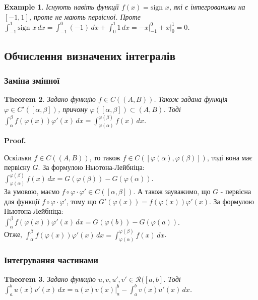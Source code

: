 \documentclass[a4paper, 10pt]{article}
\makeatletter
\def\huge{\displaystyle}
\def\qed{$\blacksquare$}
\theoremstyle{theoremdd}
\newtheorem{theorem}{Theorem}[subsection]
\theoremstyle{theoremdd}
\theoremstyle{theoremdd}
\theoremstyle{theoremdd}
\newtheorem{example}[theorem]{Example}
\theoremstyle{theoremdd}
\theoremstyle{theoremdd}
\theoremstyle{theoremdd}
\theoremstyle{theoremdd}
\renewenvironment{proof}[1][Proof.\\]{\par
\pushQED{\hfill \qed}%
\normalfont \topsep6\p@\@plus6\p@\relax
\trivlist
\item\relax
{\bfseries
#1\@addpunct{.}}\hspace\labelsep\ignorespaces
}{%
\popQED\endtrivlist\@endpefalse
}
\makeatother
\begin{document}
\begin{example}
Існують навіть функції $f(x) = \text{sign } x$, які є інтегрованими на $[-1,1]$, проте не мають первісної. Проте $\huge\int_{-1}^1 \text{sign } x \,dx = \int_{-1}^0 (-1)\,dx + \int_0^1 1 \,dx = -x \Big|_{-1}^0 + x \Big|_{0}^1 = 0$.
\end{example}

\subsection{Обчислення визначених інтегралів}
\subsubsection{Заміна змінної}
\begin{theorem}
Задано функцію $f \in C((A,B))$. Також задана функція $\varphi \in C'([\alpha,\beta])$, причому $\varphi([\alpha,\beta]) \subset (A,B)$. Тоді
$\huge\int_\alpha^\beta f(\varphi(x))\varphi'(x)\,dx = \int_{\varphi(\alpha)}^{\varphi(\beta)} f(x)\,dx$.
\end{theorem}

\begin{proof}
Оскільки $f \in C((A,B))$, то також $f \in C([\varphi(\alpha), \varphi(\beta)])$, тоді вона має первісну $G$. За формулою Ньютона-Лейбніца:\\
$\huge\int_{\varphi(\alpha)}^{\varphi(\beta)} f(x)\,dx = G(\varphi(\beta)) - G(\varphi(\alpha))$.\\
За умовою, маємо $f \circ \varphi \cdot \varphi' \in C([\alpha,\beta])$. А також зауважимо, що $G$ - первісна для функції $f \circ \varphi \cdot \varphi'$, тому що $G'(\varphi(x)) = f(\varphi(x)) \varphi'(x)$. За формулою Ньютона-Лейбніца:\\
$\huge\int_\alpha^\beta f(\varphi(x))\varphi'(x)\,dx = G(\varphi(b)) - G(\varphi(a))$.\\
Отже, $\huge\int_\alpha^\beta f(\varphi(x))\varphi'(x)\,dx = \int_{\varphi(\alpha)}^{\varphi(\beta)} f(x)\,dx$.
\end{proof}

\subsubsection{Інтегрування частинами}
\begin{theorem}
Задано функцію $u,v,u',v' \in \mathcal{R}([a,b]$. Тоді $\huge\int_a^b u(x)v'(x)\,dx = u(x)v(x) \Big|_a^b - \int_a^b v(x)u'(x)\,dx$.
\end{theorem}
\end{document}
